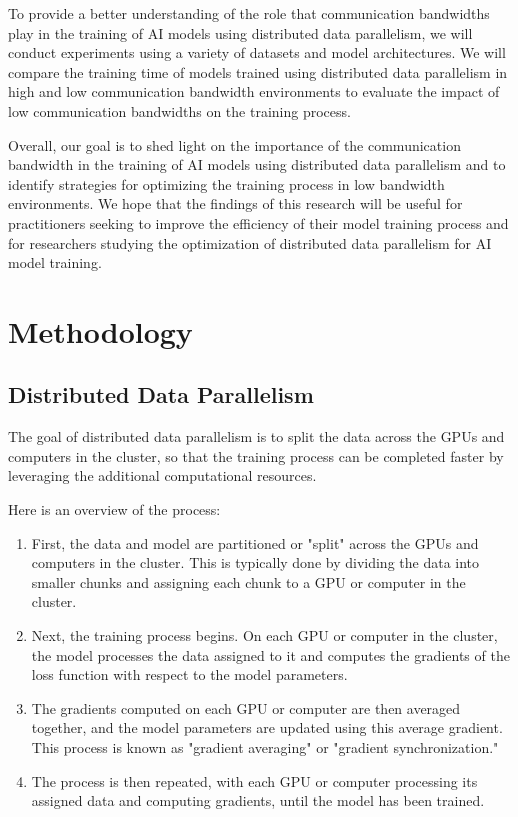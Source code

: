 \documentclass[twocolumn,10pt]{article}
\begin{document}
To provide a better understanding of the role that communication bandwidths play in the training of AI models using distributed data parallelism, we will conduct experiments using a variety of datasets and model architectures. We will compare the training time of models trained using distributed data parallelism in high and low communication bandwidth environments to evaluate the impact of low communication bandwidths on the training process.

Overall, our goal is to shed light on the importance of the communication bandwidth in the training of AI models using distributed data parallelism and to identify strategies for optimizing the training process in low bandwidth environments. We hope that the findings of this research will be useful for practitioners seeking to improve the efficiency of their model training process and for researchers studying the optimization of distributed data parallelism for AI model training.

\section{Methodology}
\subsection{Distributed Data Parallelism}
The goal of distributed data parallelism is to split the data across the GPUs and computers in the cluster, so that the training process can be completed faster by leveraging the additional computational resources.

Here is an overview of the process:

\begin{enumerate}
	\item First, the data and model are partitioned or "split" across the GPUs and computers in 			  the cluster. This is typically done by dividing the data into smaller chunks and 	  				   assigning each chunk to a GPU or computer in the cluster.
	\item Next, the training process begins. On each GPU or computer in the cluster, the model 				  processes the data assigned to it and computes the gradients of the loss function with 		  respect to the model parameters.
	\item The gradients computed on each GPU or computer are then averaged together, and the 				  model parameters are updated using this average gradient. This process is known as 				  "gradient averaging" or "gradient synchronization."
	\item The process is then repeated, with each GPU or computer processing its assigned data 				  and computing gradients, until the model has been trained.
\end{enumerate}
\end{document}
